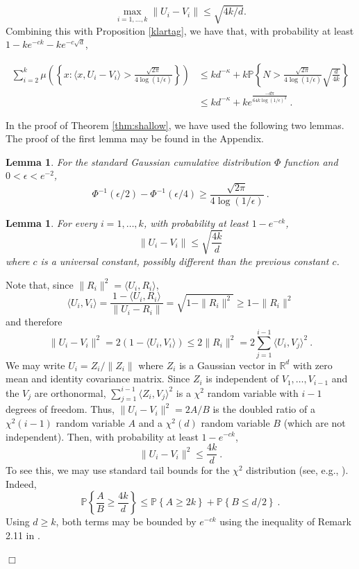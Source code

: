 \documentclass[12pt]{article}
\newcommand{\R}{\mathbb{R}}
\newcommand{\field}[1]{\mathbb{#1}}
\newcommand{\PROB}{\field{P}}
\newtheorem{lemma}[theorem]{Lemma}
\newcommand{\qed}{\hfill $\Box$}
\newenvironment{proof}{\par\noindent{\bf Proof:}}{\qed \par\medskip\noindent}
\begin{document}
$$\max_{i=1,\ldots,k} \|U_i-V_i\| \le \sqrt{4k/d}.$$
Combining this with Proposition \ref{klartag}, we have that, with probability
at least $1-ke^{-ck} - ke^{-c\sqrt{d}}$,

\begin{align*}
\sum_{i=2}^k \mu\left(\left\{x: \langle x,U_i-V_i\rangle > \frac{\sqrt{2\pi}}{4\log(1/\epsilon)} \right\}\right) & \le kd^{-\kappa} + k\PROB\left\{N > \frac{\sqrt{2\pi}}{4\log(1/\epsilon)}\sqrt{\frac{d}{4k}} \right\} \\
& \le kd^{-\kappa} + ke^{\frac{-d\pi}{64 k \log(1/\epsilon)^2}}~.
\end{align*}



In the proof of Theorem \ref{thm:shallow}, we have used the following two lemmas. 
The proof of the first lemma may be found in the Appendix.

\begin{lemma}\label{lem:PhiControl}
For the standard Gaussian cumulative distribution $\Phi$ 
function and $0<\epsilon<e^{-2}$,
\[
\Phi^{-1}(\epsilon/2)-\Phi^{-1}(\epsilon/4)\geq  \frac{\sqrt{2\pi}}{4\log(1/\epsilon)} ~.
\]
\end{lemma}



\begin{lemma}
\label{orth}
For every $i=1,\ldots,k$, with probability at least $1-e^{-ck}$,
\[
   \|U_i-V_i\| \le \sqrt{\frac{4k}{d}}
\]
where $c$ is a universal constant, possibly different than the previous constant $c$.
\end{lemma}



\begin{proof}
Note that, since $\|R_i\|^2= \langle U_i,R_i\rangle$, 
\[
   \langle U_i,V_i\rangle = \frac{1-\langle U_i,R_i\rangle }{\|U_i-R_i\|} = \sqrt{1-\|R_i\|^2}
   \ge 1-\|R_i\|^2
\]
and therefore
\[
   \|U_i-V_i\|^2= 2(1-\langle U_i,V_i\rangle ) \le 2\|R_i\|^2 = 2 \sum_{j=1}^{i-1} \langle U_i,V_j\rangle^2~.
\]
We may write $U_i=Z_i/\|Z_i\|$ where $Z_i$ is a Gaussian vector in 
$\R^d$ with zero mean and identity covariance matrix. Since $Z_i$
is independent of $V_1,\ldots,V_{i-1}$ and the $V_j$ are orthonormal,
$\sum_{j=1}^{i-1} \langle Z_i,V_j\rangle^2$ is a $\chi^2$ random variable with $i-1$ degrees
of freedom. Thus, $\|U_i-V_i\|^2=2A/B$ is the doubled ratio of a $\chi^2(i-1)$ random variable $A$ and a $\chi^2(d)$
random variable $B$ (which are not independent). 
Then, with probability at least $1-e^{-ck}$,
\[
\|U_i-V_i\|^2 \le \frac{4k}{d}~.
\]
To see this, we may use standard tail bounds
for the $\chi^2$ distribution (see, e.g., \cite{BoLuMa13}). Indeed,
\[
    \PROB\left\{ \frac{A}{B} \ge \frac{4k}{d} \right\} 
\le  \PROB\left\{ A \ge 2k \right\} + \PROB\left\{ B \le d/2 \right\}~.
\]
Using $d\ge k$, both terms may be bounded by $e^{-ck}$ using the inequality of
Remark 2.11 in \cite{BoLuMa13}.

\end{proof}
\end{document}
